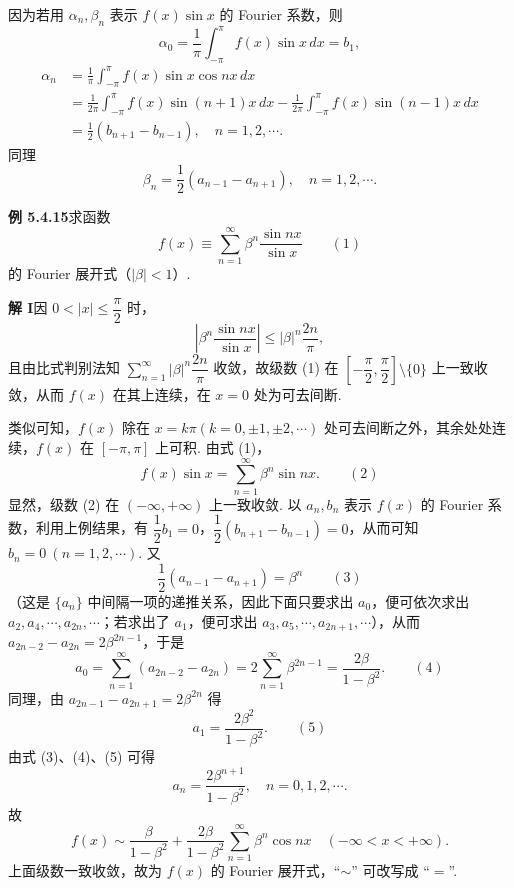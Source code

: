 \documentclass[UTF8, 12pt, fontset=fandol, oneside]{ctexart}
\begin{document}
因为若用 $\alpha_n,\beta_n$ 表示 $f(x)\sin x$ 的 Fourier 系数，则
\[
  \alpha_0=\frac1\pi\int_{-\pi}^{\pi}f(x)\sin x\,dx=b_1,
\]
\[
\begin{aligned}
\alpha_n&=\frac1\pi\int_{-\pi}^{\pi}f(x)\sin x\cos nx\,dx\\
&=\frac1{2\pi}\int_{-\pi}^{\pi}f(x)\sin(n+1)x\,dx
-\frac1{2\pi}\int_{-\pi}^{\pi}f(x)\sin(n-1)x\,dx\\
&=\frac12(b_{n+1}-b_{n-1}),\quad n=1,2,\cdots.
\end{aligned}
\]
同理
\[
  \beta_n=\frac12(a_{n-1}-a_{n+1}),\quad n=1,2,\cdots.
\]

\noindent\textbf{例 5.4.15}\quad 求函数
\[
  f(x)\equiv\sum_{n=1}^{\infty}\beta^n\frac{\sin nx}{\sin x} \qquad(1)
\]
的 Fourier 展开式（$|\beta|<1$）.

\noindent\textbf{解 I}\quad 因 $0<|x|\le\dfrac{\pi}{2}$ 时，
\[
  \left|\beta^n\frac{\sin nx}{\sin x}\right|\le |\beta|^n\frac{2n}{\pi},
\]
且由比式判别法知 $\displaystyle\sum_{n=1}^{\infty}|\beta|^n\dfrac{2n}{\pi}$ 收敛，故级数 (1) 在
$\left[-\dfrac{\pi}{2},\dfrac{\pi}{2}\right]\setminus\{0\}$ 上一致收敛，从而 $f(x)$ 在其上连续，在 $x=0$ 处为可去间断.

类似可知，$f(x)$ 除在 $x=k\pi(k=0,\pm1,\pm2,\cdots)$ 处可去间断之外，其余处处连续，$f(x)$ 在 $[-\pi,\pi]$ 上可积. 由式 (1)，
\[
  f(x)\sin x=\sum_{n=1}^{\infty}\beta^n\sin nx. \qquad(2)
\]
显然，级数 (2) 在 $(-\infty,+\infty)$ 上一致收敛. 以 $a_n,b_n$ 表示 $f(x)$ 的 Fourier 系数，利用上例结果，有
$\dfrac12b_1=0$，$\dfrac12(b_{n+1}-b_{n-1})=0$，从而可知 $b_n=0\ (n=1,2,\cdots)$. 又
\[
  \frac12(a_{n-1}-a_{n+1})=\beta^n \qquad(3)
\]
（这是 $\{a_n\}$ 中间隔一项的递推关系，因此下面只要求出 $a_0$，便可依次求出
$a_2,a_4,\cdots,a_{2n},\cdots$；若求出了 $a_1$，便可求出 $a_3,a_5,\cdots,a_{2n+1},\cdots$），从而
$a_{2n-2}-a_{2n}=2\beta^{2n-1}$，于是
\[
  a_0=\sum_{n=1}^{\infty}(a_{2n-2}-a_{2n})
  =2\sum_{n=1}^{\infty}\beta^{2n-1}=\frac{2\beta}{1-\beta^2}. \qquad(4)
\]
同理，由 $a_{2n-1}-a_{2n+1}=2\beta^{2n}$ 得
\[
  a_1=\frac{2\beta^2}{1-\beta^2}. \qquad(5)
\]
由式 (3)、(4)、(5) 可得
\[
  a_n=\frac{2\beta^{n+1}}{1-\beta^2},\quad n=0,1,2,\cdots.
\]
故
\[
  f(x)\sim\frac{\beta}{1-\beta^2}
  +\frac{2\beta}{1-\beta^2}\sum_{n=1}^{\infty}\beta^n\cos nx\quad(-\infty<x<+\infty).
\]
上面级数一致收敛，故为 $f(x)$ 的 Fourier 展开式，``$\sim$'' 可改写成 ``$=$''.
\end{document}
